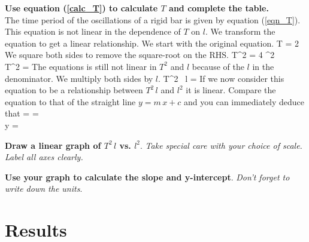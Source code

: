 \documentclass{article}
\begin{document}
      \textbf{Use equation (\ref{calc_T}) to calculate $T$ and complete the table.}\\

      The time period of the oscillations of a rigid bar is given by equation (\ref{eqn_T}). This equation is not linear in the dependence of $T$ on $l$. We transform the equation to get a linear relationship. We start with the original equation.
%
      \beqn
         T = 2 \pi {}
      \eeqn
      We square both sides to remove the square-root on the RHS.
      \beqsn
         T^2 = 4 \pi^2  \\[0.25\baselineskip]
         \imply T^2 =  
      \eeqsn
      The equations is still not linear in $T^2$ and $l$ because of the $l$ in the denominator. We multiply both sides by $l$.
      \beq
         T^2 \, l =  
      \eeq
      If we now consider this equation to be a relationship between $T^2 \, l$ and $l^2$ it is linear. Compare the equation to that of the straight line $y = m \, x + c$ and you can immediately deduce that
      \beqc \label{graph}
          =  = \\[0.5\baselineskip]
         y = 
      \eeqc

      \textbf{Draw a linear graph of $T^2 \, l$ vs. $l^2$}. \textit{Take special care with your choice of scale. Label all axes clearly.}

      \textbf{Use your graph to calculate the slope and y-intercept}. \textit{Don't forget to write down the units}.


   \section*{Results}
\end{document}
